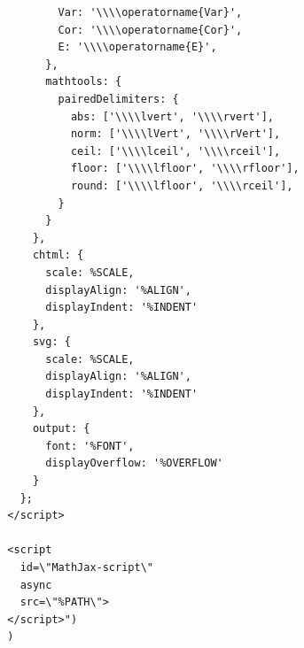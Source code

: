 \documentclass[11pt]{article}
\begin{document}
\begin{verbatim}
          Var: '\\\\operatorname{Var}',
          Cor: '\\\\operatorname{Cor}',
          E: '\\\\operatorname{E}',
        },
        mathtools: {
          pairedDelimiters: {
            abs: ['\\\\lvert', '\\\\rvert'],
            norm: ['\\\\lVert', '\\\\rVert'],
            ceil: ['\\\\lceil', '\\\\rceil'],
            floor: ['\\\\lfloor', '\\\\rfloor'],
            round: ['\\\\lfloor', '\\\\rceil'],
          }
        }
      },
      chtml: {
        scale: %SCALE,
        displayAlign: '%ALIGN',
        displayIndent: '%INDENT'
      },
      svg: {
        scale: %SCALE,
        displayAlign: '%ALIGN',
        displayIndent: '%INDENT'
      },
      output: {
        font: '%FONT',
        displayOverflow: '%OVERFLOW'
      }
    };
  </script>

  <script
    id=\"MathJax-script\"
    async
    src=\"%PATH\">
  </script>")
  )
\end{verbatim}
\end{document}
